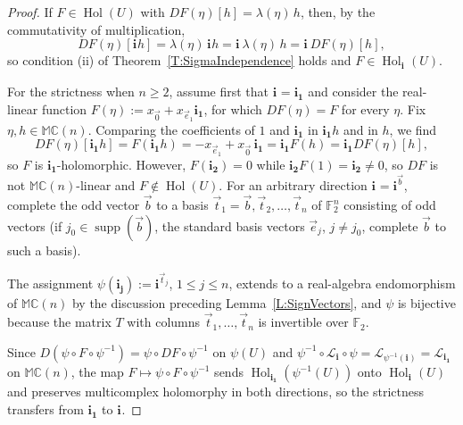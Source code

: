 \documentclass[12pt]{amsart}
\theoremstyle{plain}
\theoremstyle{definition}
\numberwithin{equation}{section}
\newcommand{\im}[1]{\mathbf{ i_{#1}}}
\newcommand{\mC}{\mathbb{C}}
\newcommand{\mM}{\mathbb{M}}
\newcommand{\cL}{\mathcal{L}}
\DeclareMathOperator{\hol}{Hol}
\begin{document}
    \begin{proof}
    If $F \in \hol(U)$ with $DF (\eta )[h] = \lambda (\eta )\, h$, then, by the commutativity of multiplication,
    \[
    DF (\eta) [\im{} h] = \lambda (\eta )\, \im{} h = \im{}\, \lambda (\eta )\, h = \im{}\, DF (\eta )[h],
    \]
    so condition (ii) of Theorem~\ref{T:SigmaIndependence} holds and $F \in \hol_{\im{}} (U)$.

    For the strictness when $n \geq 2$, assume first that $\im{} = \im{1}$ and consider the real-linear function $F (\eta ) := x_{\vec 0} + x_{\vec e_1} \im{1}$, for which $DF (\eta ) = F$ for every $\eta$. Fix $\eta, h \in \mM \mC(n)$. Comparing the coefficients of $1$ and $\im{1}$ in $\im{1} h$ and in $h$, we find 
        \[
        DF(\eta) [\im{1} h] = F(\im{1}h) = -x_{\vec{e}_1} + x_{\vec{0}}\, \im{1} = \im{1} F(h) = \im{1} DF(\eta)[h],
        \]
    so $F$ is $\im{1}$-holomorphic. However, $F (\im{2}) = 0$ while $\im{2} F (1) = \im{2} \neq 0$, so $DF$ is not $\mM \mC(n)$-linear and $F \notin \hol(U)$. For an arbitrary direction $\im{} = \mathbf i^{\vec b}$, complete the odd vector $\vec b$ to a basis $\vec t_1 = \vec b , \vec t_2 , \ldots , \vec t_n$ of $\mathbb F_2^n$ consisting of odd vectors (if $j_0 \in \operatorname{supp} (\vec b)$, the standard basis vectors $\vec e_j$, $j \neq j_0$, complete $\vec b$ to such a basis).
    
      The assignment $\psi (\im{j}) := \mathbf i^{\vec t_j}$, $1 \leq j \leq n$, extends to a real-algebra endomorphism of $\mM \mC(n)$ by the discussion preceding Lemma~\ref{L:SignVectors}, and $\psi$ is bijective because the matrix $T$ with columns $\vec t_1 , \ldots , \vec t_n$ is invertible over $\mathbb F_2$.
    
      Since $D (\psi \circ F \circ \psi^{-1}) = \psi \circ DF \circ \psi^{-1}$ on $\psi (U)$ and $\psi^{-1} \circ \cL_{\im{}} \circ \psi = \cL_{\psi^{-1} (\im{})} = \cL_{\im{1}}$ on $\mM \mC (n)$, the map $F \mapsto \psi \circ F \circ \psi^{-1}$ sends $\hol_{\im{1}} (\psi^{-1} (U))$ onto $\hol_{\im{}} (U)$ and preserves multicomplex holomorphy in both directions, so the strictness transfers from $\im{1}$ to $\im{}$.
    \end{proof}
\end{document}
